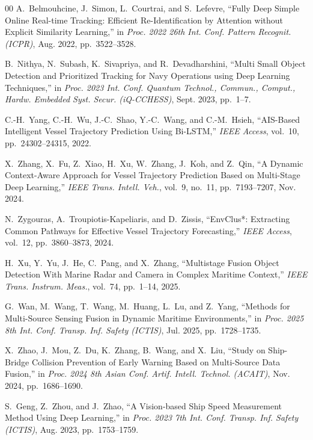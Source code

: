 \documentclass{ieeeaccess}
\begin{document}
\begin{thebibliography}{00}
A.~Belmouhcine, J.~Simon, L.~Courtrai, and S.~Lefevre,
``Fully Deep Simple Online Real-time Tracking: Efficient
Re-Identification by Attention without Explicit Similarity Learning,''
in \emph{Proc. 2022 26th Int. Conf. Pattern Recognit. (ICPR)},
Aug. 2022, pp.~3522--3528.

B.~Nithya, N.~Subash, K.~Sivapriya, and R.~Devadharshini,
``Multi Small Object Detection and Prioritized Tracking for Navy
Operations using Deep Learning Techniques,''
in \emph{Proc. 2023 Int. Conf. Quantum Technol., Commun., Comput.,
Hardw. Embedded Syst. Secur. (iQ-CCHESS)}, Sept. 2023, pp.~1--7.

C.-H.~Yang, C.-H.~Wu, J.-C.~Shao, Y.-C.~Wang, and C.-M.~Hsieh,
``AIS-Based Intelligent Vessel Trajectory Prediction Using Bi-LSTM,''
\emph{IEEE Access},
vol.~10, pp.~24302--24315, 2022.

X.~Zhang, X.~Fu, Z.~Xiao, H.~Xu, W.~Zhang, J.~Koh, and Z.~Qin,
``A Dynamic Context-Aware Approach for Vessel Trajectory Prediction
Based on Multi-Stage Deep Learning,''
\emph{IEEE Trans. Intell. Veh.},
vol.~9, no.~11, pp.~7193--7207, Nov. 2024.

N.~Zygouras, A.~Troupiotis-Kapeliaris, and D.~Zissis,
``EnvClus*: Extracting Common Pathways for Effective Vessel Trajectory
Forecasting,''
\emph{IEEE Access},
vol.~12, pp.~3860--3873, 2024.

H.~Xu, Y.~Yu, J.~He, C.~Pang, and X.~Zhang,
``Multistage Fusion Object Detection With Marine Radar and Camera
in Complex Maritime Context,''
\emph{IEEE Trans. Instrum. Meas.},
vol.~74, pp.~1--14, 2025.

G.~Wan, M.~Wang, T.~Wang, M.~Huang, L.~Lu, and Z.~Yang,
``Methods for Multi-Source Sensing Fusion in Dynamic Maritime
Environments,''
in \emph{Proc. 2025 8th Int. Conf. Transp. Inf. Safety (ICTIS)},
Jul. 2025, pp.~1728--1735.

X.~Zhao, J.~Mou, Z.~Du, K.~Zhang, B.~Wang, and X.~Liu,
``Study on Ship-Bridge Collision Prevention of Early Warning Based
on Multi-Source Data Fusion,''
in \emph{Proc. 2024 8th Asian Conf. Artif. Intell. Technol. (ACAIT)},
Nov. 2024, pp.~1686--1690.

S.~Geng, Z.~Zhou, and J.~Zhao,
``A Vision-based Ship Speed Measurement Method Using Deep Learning,''
in \emph{Proc. 2023 7th Int. Conf. Transp. Inf. Safety (ICTIS)},
Aug. 2023, pp.~1753--1759.



\end{thebibliography}
\end{document}
